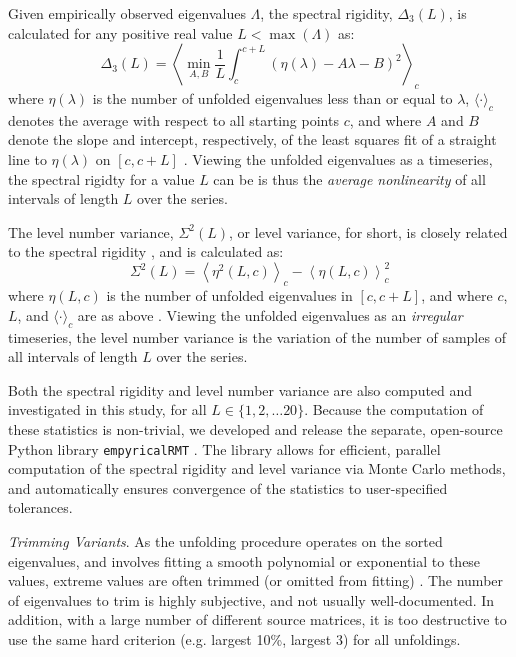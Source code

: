 \documentclass[12pt]{spieman}  %
\newcommand{\code}[1]{\small \texttt{#1} \normalsize}
\begin{document}
\begin{spacing}{2}
Given empirically observed eigenvalues \(\Lambda\), the spectral rigidity,
\(\Delta_3(L)\), is calculated for any positive real value \(L <
\max(\Lambda)\) as:
\begin{equation}
\label{eq:rigidity}
\Delta_3(L) = \left \langle \min_{A,B} \frac{1}{L} \int_c^{c+L} \left(  \eta(\lambda) -A \lambda - B \right)^2 \right \rangle_c
\end{equation}
where \(\eta(\lambda)\) is the number of unfolded eigenvalues less than or
equal to \(\lambda\), \(\langle \cdot \rangle_c\) denotes the average with
respect to all starting points \(c\), and where \(A\) and \(B\) denote the
slope and intercept, respectively, of the least squares fit of a straight line
to \(\eta(\lambda)\) on \([c, c+L]\)
\cite{guhrRandommatrixTheoriesQuantum1998a}. Viewing the unfolded eigenvalues
as a timeseries, the spectral rigidty for a value \(L\) can be is thus the
\textit{average nonlinearity} of all intervals of length \(L\) over the series.


The level number variance, \(\Sigma^2(L)\), or level variance, for short, is
closely related to the spectral rigidity \cite{mehtaRandomMatrices2004}, and is
calculated as:
\begin{equation}
\label{eq:levlvar}
\Sigma^2(L) = \left\langle \eta^2(L, c) \right\rangle_c - \left\langle \eta(L, c) \right\rangle^2_c
\end{equation}
where \(\eta(L, c)\) is the number of unfolded eigenvalues in \([c, c+ L]\),
and where \(c\), \(L\), and \(\langle \cdot \rangle_c\) are as above
\cite{guhrRandommatrixTheoriesQuantum1998a}. Viewing the unfolded eigenvalues
as an \textit{irregular} timeseries, the level number variance is the
variation of the number of samples of all intervals of length \(L\) over the
series.

Both the spectral rigidity and level number variance are also computed and
investigated in this study, for all \(L \in \{ 1, 2, \dots 20 \}\).
Because the computation of these statistics is non-trivial, we developed and
release the separate, open-source Python library
\code{empyricalRMT}\cite{dm-bergerStfxecutablesEmpyricalRMTV12022}. The library
allows for efficient, parallel computation of the spectral rigidity and level
variance via Monte Carlo methods, and automatically ensures convergence of the
statistics to user-specified tolerances.

\textit{Trimming Variants}. As the unfolding procedure operates on the sorted
eigenvalues, and involves fitting a smooth polynomial or exponential to these
values, extreme values are often trimmed (or omitted from fitting)
\cite{moralesImprovedUnfoldingDetrending2011,
abueleninEffectUnfoldingSpectral2012}. The number of eigenvalues to trim is
highly subjective, and not usually well-documented. In addition, with a large
number of different source matrices, it is too destructive to use the same hard
criterion (e.g. largest 10\%, largest 3) for all unfoldings.


\end{spacing}
\end{document}
